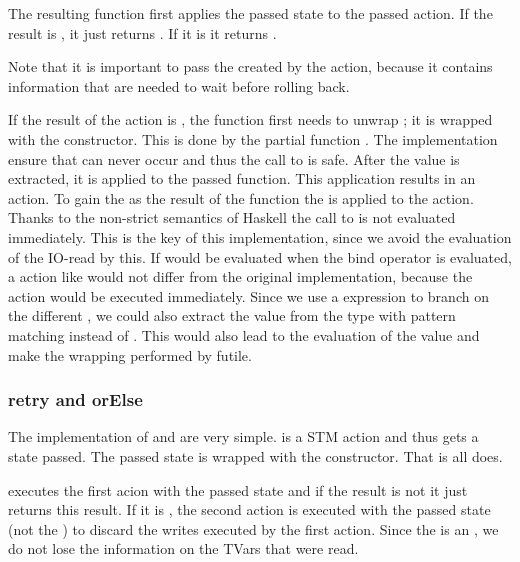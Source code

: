 The resulting function first applies the passed state to the passed action. 
If the result is , it just returns . If it is
 it returns . 

Note that it is important to 
pass the  created by the action, because it contains information that
are needed to wait before rolling back. 

If the result of the action is 
, the function first needs to unwrap ; it is wrapped with 
the  constructor. This is done by the partial function . The
implementation ensure that  can never occur and thus the call to 
 is safe. After the value is extracted, it is applied to the passed 
function. This application results in an  action. To gain the  as 
the result of the function the  is applied to the action.
Thanks to the non-strict semantics of Haskell the call to  is not evaluated 
immediately. This is the key of this implementation, since we avoid the evaluation of 
the IO-read by this. If  would be evaluated when the bind operator is evaluated,
a action like  would not differ from the original implementation,
because the  action would be executed immediately. 
Since we use a  expression to branch on the different , we 
could also extract the value from the  type with pattern matching instead 
of . This would also lead to the evaluation of the value and 
make the wrapping performed by  futile.

\subsubsection{retry and orElse}
The implementation of  and  are very simple.  is a 
STM action and thus gets a state passed. The passed state is wrapped with the  constructor.
That is all  does. 

 executes the first acion with the passed state and if the result is not 
 it just returns this result. If it is ,
the second action is executed with the passed state (not the ) to discard the 
writes executed by the first action. Since the  is an , 
we do not lose the information on the TVars that were read. 



